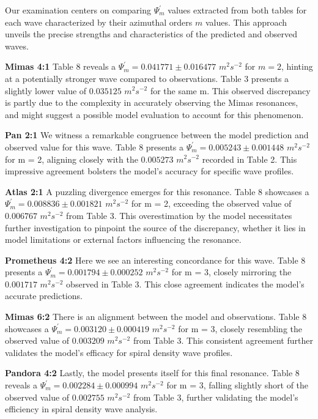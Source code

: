 \documentclass{article}
\begin{document}
Our examination centers on comparing $\Psi_{m}^{'}$ values extracted from both tables for each wave characterized by their azimuthal orders $m$ values. This approach unveils the precise strengths and characteristics of the predicted and observed waves.

\textbf{Mimas 4:1}
Table 8 reveals a $\Psi_{m}^{'} = 0.041771 \pm 0.016477$ $m^{2}s^{-2}$ for $m = 2$, hinting at a potentially stronger wave compared to observations. Table 3 presents a slightly lower value of $0.035125$ $m^{2}s^{-2}$ for the same m. This observed discrepancy is partly due to the complexity in accurately observing the Mimas resonances, and might suggest a possible model evaluation to account for this phenomenon.

\textbf{Pan 2:1}
We witness a remarkable congruence between the model prediction and observed value for this wave. Table 8 presents a $\Psi_{m}^{'} = 0.005243 \pm 0.001448$ $m^{2}s^{-2}$ for m = 2, aligning closely with the $0.005273$ $m^{2}s^{-2}$ recorded in Table 2. This impressive agreement bolsters the model's accuracy for specific wave profiles.

\textbf{Atlas 2:1}
A puzzling divergence emerges for this resonance. Table 8 showcases a $\Psi_{m}^{'} = 0.008836 \pm 0.001821$ $m^{2}s^{-2}$ for m = 2, exceeding the observed value of $0.006767$ $m^{2}s^{-2}$ from Table 3. This overestimation by the model necessitates further investigation to pinpoint the source of the discrepancy, whether it lies in model limitations or external factors influencing the resonance.

\textbf{Prometheus 4:2}
Here we see an interesting concordance for this wave. Table 8 presents a $\Psi_{m}^{'} = 0.001794 \pm 0.000252$ $m^{2}s^{-2}$ for m = 3, closely mirroring the $0.001717$ $m^{2}s^{-2}$ observed in Table 3. This close agreement indicates the model's accurate predictions.

\textbf{Mimas 6:2}
 There is an alignment between the model and observations. Table 8 showcases a $\Psi_{m}^{'} = 0.003120 \pm 0.000419$ $m^{2}s^{-2}$ for m = 3, closely resembling the observed value of $0.003209$ $m^{2}s^{-2}$ from Table 3. This consistent agreement further validates the model's efficacy for spiral density wave profiles.

\textbf{Pandora 4:2}
Lastly, the model presents itself for this final resonance. Table 8 reveals a $\Psi_{m}^{'} = 0.002284 \pm 0.000994$ $m^{2}s^{-2}$ for m = 3, falling slightly short of the observed value of $0.002755$ $m^{2}s^{-2}$ from Table 3, further validating the model's efficiency in spiral density wave analysis.
\end{document}
